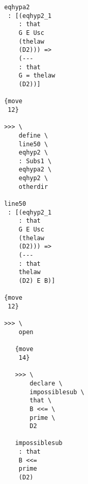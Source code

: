 \documentclass[12pt]{article}
\begin{document}
\begin{verbatim}
                                       eqhypa2 
                                        : [(eqhyp2_1 
                                           : that 
                                           G E Usc 
                                           (thelaw 
                                           (D2))) => 
                                           (--- 
                                           : that 
                                           G = thelaw 
                                           (D2))]

                                       {move 
                                        12}

                                       >>> \
                                           define \
                                           line50 \
                                           eqhyp2 \
                                           : Subs1 \
                                           eqhypa2 \
                                           eqhyp2 \
                                           otherdir

                                       line50 
                                        : [(eqhyp2_1 
                                           : that 
                                           G E Usc 
                                           (thelaw 
                                           (D2))) => 
                                           (--- 
                                           : that 
                                           thelaw 
                                           (D2) E B)]

                                       {move 
                                        12}

                                       >>> \
                                           open

                                          {move 
                                           14}

                                          >>> \
                                              declare \
                                              impossiblesub \
                                              that \
                                              B <<= \
                                              prime \
                                              D2

                                          impossiblesub 
                                           : that 
                                           B <<= 
                                           prime 
                                           (D2)


\end{verbatim}
\end{document}
